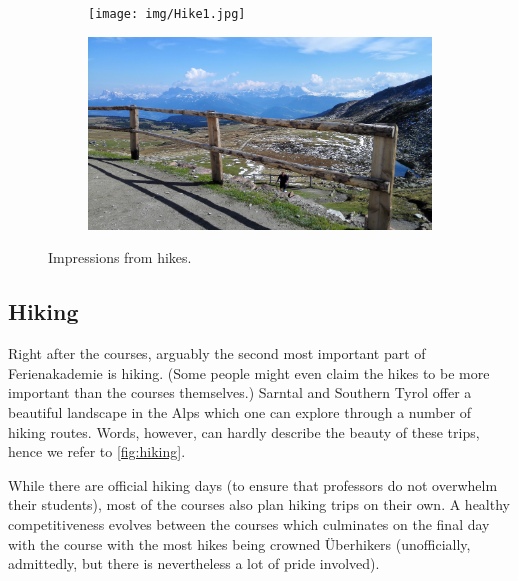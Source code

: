 \begin{figure}[ht]%
	\centering
    \begin{subfigure}[t]{0.5\textwidth}
 	\begin{center}%
 		\texttt{[image: img/Hike1.jpg]}%
 	\end{center}%
    \end{subfigure}%
    \begin{subfigure}[t]{0.5\textwidth}
 	\begin{center}%
 		\includegraphics[scale=0.05]{img/Hike2.jpg}%
 	\end{center}%
    \end{subfigure}
    \caption{Impressions from hikes.}
    \label{fig:hiking}
\end{figure}
\subsection{Hiking}
Right after the courses, arguably the second most important part of Ferienakademie is hiking. (Some people might even claim the hikes to be more important than the courses themselves.) Sarntal and Southern Tyrol offer a beautiful landscape in the Alps which one can explore through a number of hiking routes. Words, however, can hardly describe the beauty of these trips, hence we refer to \autoref{fig:hiking}. 

While there are official hiking days (to ensure that professors do not overwhelm their students), most of the courses also plan hiking trips on their own. A healthy competitiveness evolves between the courses which culminates on the final day with the course with the most hikes being crowned \"Uberhikers (unofficially, admittedly, but there is nevertheless a lot of pride involved).

